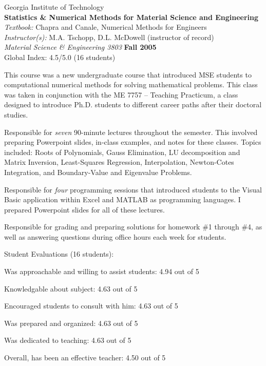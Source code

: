Georgia Institute of Technology \\
{\bf Statistics \& Numerical Methods for Material Science and Engineering} \\ 
{\it Textbook:} Chapra and Canale, {Numerical Methods for Engineers} \\
{\it Instructor(s):} M.A. Tschopp, D.L. McDowell (instructor of record) \\
{\em Material Science \& Engineering 3803} \hfill    {\bf Fall 2005} \\
Global Index: 4.5/5.0 (16 students)

\begin{list2}
\vspace*{.05in}
\item This course was a new undergraduate course that introduced MSE students to computational numerical methods for solving mathematical problems.  This class was taken in conjunction with the ME 7757 -- Teaching Practicum, a class designed to introduce Ph.D. students to different career paths after their doctoral studies.
\item	Responsible for \textit{seven} 90-minute lectures throughout the semester.  This involved preparing Powerpoint slides, in-class examples, and notes for these classes.  Topics included: Roots of Polynomials, Gauss Elimination, LU decomposition and Matrix Inversion, Least-Squares Regression, Interpolation, Newton-Cotes Integration, and Boundary-Value and Eigenvalue Problems.
\item	Responsible for \textit{four} programming sessions that introduced students to the Visual Basic application within Excel and MATLAB as programming languages.  I prepared Powerpoint slides for all of these lectures. 
\item	Responsible for grading and preparing solutions for homework \#1 through \#4, as well as answering questions during office hours each week for students.  
\item	Student Evaluations (16 students):
	\begin{list2}
	\item Was approachable and willing to assist students: 4.94 out of 5
	\item Knowledgable about subject: 4.63 out of 5
	\item Encouraged students to consult with him: 4.63 out of 5
	\item Was prepared and organized: 4.63 out of 5
	\item Was dedicated to teaching: 4.63 out of 5
	\item Overall, has been an effective teacher: 4.50 out of 5
	\end{list2}
\end{list2}

